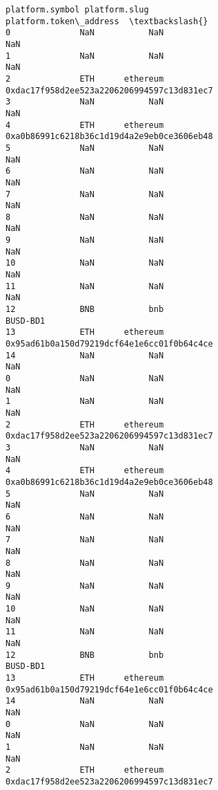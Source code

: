 \documentclass[11pt]{article}
\begin{document}
\begin{tcolorbox}[breakable, size=fbox, boxrule=.5pt, pad at break*=1mm, opacityfill=0]
\begin{Verbatim}[commandchars=\\\{\}]
   platform.symbol platform.slug                      platform.token\_address  \textbackslash{}
0              NaN           NaN                                         NaN
1              NaN           NaN                                         NaN
2              ETH      ethereum  0xdac17f958d2ee523a2206206994597c13d831ec7
3              NaN           NaN                                         NaN
4              ETH      ethereum  0xa0b86991c6218b36c1d19d4a2e9eb0ce3606eb48
5              NaN           NaN                                         NaN
6              NaN           NaN                                         NaN
7              NaN           NaN                                         NaN
8              NaN           NaN                                         NaN
9              NaN           NaN                                         NaN
10             NaN           NaN                                         NaN
11             NaN           NaN                                         NaN
12             BNB           bnb                                    BUSD-BD1
13             ETH      ethereum  0x95ad61b0a150d79219dcf64e1e6cc01f0b64c4ce
14             NaN           NaN                                         NaN
0              NaN           NaN                                         NaN
1              NaN           NaN                                         NaN
2              ETH      ethereum  0xdac17f958d2ee523a2206206994597c13d831ec7
3              NaN           NaN                                         NaN
4              ETH      ethereum  0xa0b86991c6218b36c1d19d4a2e9eb0ce3606eb48
5              NaN           NaN                                         NaN
6              NaN           NaN                                         NaN
7              NaN           NaN                                         NaN
8              NaN           NaN                                         NaN
9              NaN           NaN                                         NaN
10             NaN           NaN                                         NaN
11             NaN           NaN                                         NaN
12             BNB           bnb                                    BUSD-BD1
13             ETH      ethereum  0x95ad61b0a150d79219dcf64e1e6cc01f0b64c4ce
14             NaN           NaN                                         NaN
0              NaN           NaN                                         NaN
1              NaN           NaN                                         NaN
2              ETH      ethereum  0xdac17f958d2ee523a2206206994597c13d831ec7

\end{Verbatim}
\end{tcolorbox}
\end{document}
